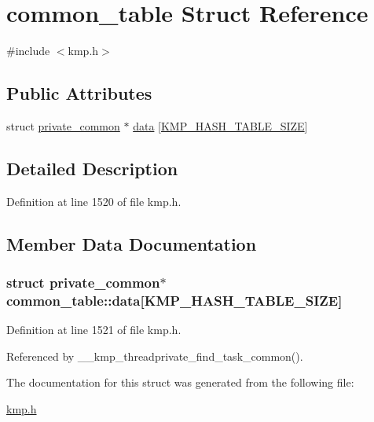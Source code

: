 \hypertarget{structcommon__table}{\section{common\-\_\-table Struct Reference}
\label{structcommon__table}
}


{\ttfamily \#include $<$kmp.\-h$>$}

\subsection*{Public Attributes}
\begin{DoxyCompactItemize}
\item 
struct \hyperlink{structprivate__common}{private\-\_\-common} $\ast$ \hyperlink{structcommon__table_a87c62cea9e986994ca363b2630291621}{data} \mbox{[}\hyperlink{kmp_8h_a18bbfe585fccb920012f9477c07977b7}{K\-M\-P\-\_\-\-H\-A\-S\-H\-\_\-\-T\-A\-B\-L\-E\-\_\-\-S\-I\-Z\-E}\mbox{]}
\end{DoxyCompactItemize}


\subsection{Detailed Description}


Definition at line 1520 of file kmp.\-h.



\subsection{Member Data Documentation}
\hypertarget{structcommon__table_a87c62cea9e986994ca363b2630291621}{
\subsubsection[{data}]{\setlength{\rightskip}{0pt plus 5cm}struct {\bf private\-\_\-common}$\ast$ common\-\_\-table\-::data\mbox{[}{\bf K\-M\-P\-\_\-\-H\-A\-S\-H\-\_\-\-T\-A\-B\-L\-E\-\_\-\-S\-I\-Z\-E}\mbox{]}}}\label{structcommon__table_a87c62cea9e986994ca363b2630291621}


Definition at line 1521 of file kmp.\-h.



Referenced by \-\_\-\-\_\-kmp\-\_\-threadprivate\-\_\-find\-\_\-task\-\_\-common().



The documentation for this struct was generated from the following file\-:\begin{DoxyCompactItemize}
\item 
\hyperlink{kmp_8h}{kmp.\-h}\end{DoxyCompactItemize}
